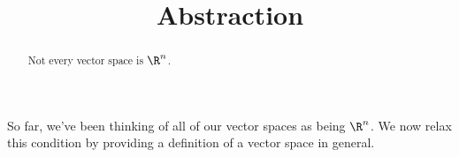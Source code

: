 \documentclass{ximera}
\title{Abstraction}
\begin{document}
\begin{abstract}
  Not every vector space is $\R^n$.
\end{abstract}

So far, we've been thinking of all of our vector spaces as being
$\R^n$.  We now relax this condition by providing a definition of a
vector space in general.
\end{document}
